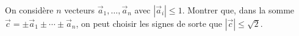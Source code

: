 On considère $n$ vecteurs $\vec a_1, \ldots, \vec a_n$ avec $|\vec a_i| \leq 1$. Montrer que, dans la somme $\vec c = \pm\vec a_1 \pm \cdots \pm \vec a_n$, on peut choisir les signes de sorte que $|\vec c| \leq \sqrt{2}$.

